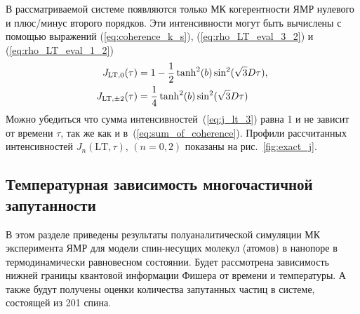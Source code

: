 В рассматриваемой системе появляются только МК когерентности ЯМР нулевого и плюс/минус второго порядков.
Эти интенсивности могут быть вычислены с помощью выражений
(\ref{eq:coherence_k_s}), (\ref{eq:rho_LT_eval_3_2}) и (\ref{eq:rho_LT_eval_1_2})
%
\begin{align}\label{eq:j_lt_3}
  J_{\mathrm{LT}, 0}(\tau) & = 1 - \frac 1 2 \tanh^2(b)\sin^2(\sqrt 3 D \tau), \notag \\
  J_{\mathrm{LT},\pm 2}(\tau) & = \frac 1 4 \tanh^2(b)\sin^2(\sqrt 3 D \tau)
\end{align}
%
Можно убедиться что сумма интенсивностей~(\ref{eq:j_lt_3}) равна 1
и не зависит от времени $\tau$, так же как и в~(\ref{eq:sum_of_coherence}).
Профили рассчитанных интенсивностей $J_n(\mathrm{LT}, \tau)$, $(n=0,2)$ показаны на рис.~\ref{fig:exact_j}.


\subsection{Температурная зависимость многочастичной запутанности}
\label{sec:entanglement}
В этом разделе приведены результаты полуаналитической симуляции МК эксперимента ЯМР
для модели спин-несущих молекул (атомов) в нанопоре в термодинамически равновесном состоянии.
Будет рассмотрена зависимость нижней границы квантовой информации Фишера от времени и температуры.
А также будут получены оценки количества запутанных частиц в системе,
состоящей из 201 спина.

